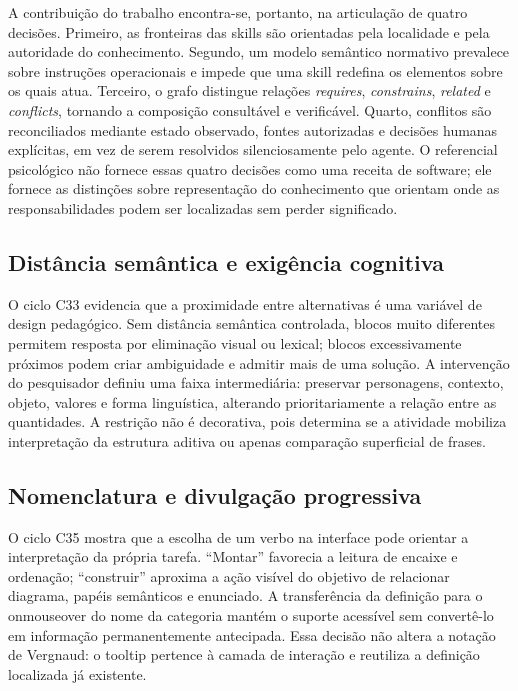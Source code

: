\documentclass[preprint,12pt,authoryear]{elsarticle}
\begin{document}
A contribuição do trabalho encontra-se, portanto, na articulação de quatro decisões. Primeiro, as fronteiras das skills são orientadas pela localidade e pela autoridade do conhecimento. Segundo, um modelo semântico normativo prevalece sobre instruções operacionais e impede que uma skill redefina os elementos sobre os quais atua. Terceiro, o grafo distingue relações \emph{requires}, \emph{constrains}, \emph{related} e \emph{conflicts}, tornando a composição consultável e verificável. Quarto, conflitos são reconciliados mediante estado observado, fontes autorizadas e decisões humanas explícitas, em vez de serem resolvidos silenciosamente pelo agente. O referencial psicológico não fornece essas quatro decisões como uma receita de software; ele fornece as distinções sobre representação do conhecimento que orientam onde as responsabilidades podem ser localizadas sem perder significado.

\subsection{Distância semântica e exigência cognitiva}
O ciclo C33 evidencia que a proximidade entre alternativas é uma variável de design pedagógico. Sem distância semântica controlada, blocos muito diferentes permitem resposta por eliminação visual ou lexical; blocos excessivamente próximos podem criar ambiguidade e admitir mais de uma solução. A intervenção do pesquisador definiu uma faixa intermediária: preservar personagens, contexto, objeto, valores e forma linguística, alterando prioritariamente a relação entre as quantidades. A restrição não é decorativa, pois determina se a atividade mobiliza interpretação da estrutura aditiva ou apenas comparação superficial de frases.

\subsection{Nomenclatura e divulgação progressiva}
O ciclo C35 mostra que a escolha de um verbo na interface pode orientar a interpretação da própria tarefa. ``Montar'' favorecia a leitura de encaixe e ordenação; ``construir'' aproxima a ação visível do objetivo de relacionar diagrama, papéis semânticos e enunciado. A transferência da definição para o onmouseover do nome da categoria mantém o suporte acessível sem convertê-lo em informação permanentemente antecipada. Essa decisão não altera a notação de Vergnaud: o tooltip pertence à camada de interação e reutiliza a definição localizada já existente.
\end{document}
